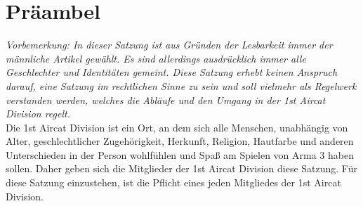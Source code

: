 \section*{Präambel}
\label{sec:praeambel}

\textit{Vorbemerkung: In dieser Satzung ist aus Gründen der Lesbarkeit immer der männliche Artikel gewählt. 
Es sind allerdings ausdrücklich immer alle Geschlechter und Identitäten gemeint. 
Diese Satzung erhebt keinen Anspruch darauf, eine Satzung im rechtlichen Sinne zu sein und soll vielmehr als Regelwerk verstanden werden, 
welches die Abläufe und den Umgang in der 1st Aircat Division regelt.}\\
\noindent
Die 1st Aircat Division ist ein Ort, an dem sich alle Menschen, unabhängig von Alter, geschlechtlicher Zugehörigkeit, Herkunft, Religion, Hautfarbe 
und anderen Unterschieden in der Person wohlfühlen und Spaß am Spielen von Arma 3 haben sollen. 
Daher geben sich die Mitglieder der 1st Aircat Division diese Satzung. 
Für diese Satzung einzustehen, ist die Pflicht eines jeden Mitgliedes der 1st Aircat Division.